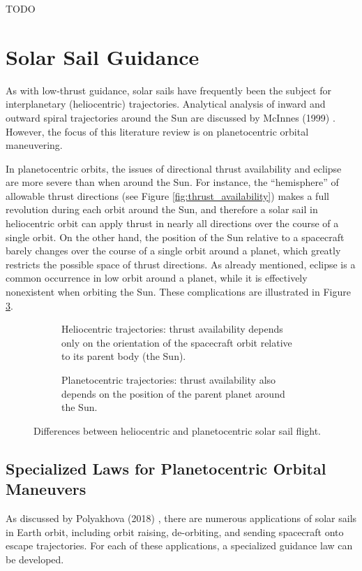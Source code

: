TODO


\section{Solar Sail Guidance}
As with low-thrust guidance, solar sails have frequently been the subject for interplanetary (heliocentric) trajectories. Analytical analysis of inward and outward spiral trajectories around the Sun are discussed by McInnes (1999) \cite{mcinnes}. However, the focus of this literature review is on planetocentric orbital maneuvering.

In planetocentric orbits, the issues of directional thrust availability and eclipse are more severe than when around the Sun. For instance, the ``hemisphere'' of allowable thrust directions (see Figure \ref{fig:thrust_availability}) makes a full revolution during each orbit around the Sun, and therefore a solar sail in heliocentric orbit can apply thrust in nearly all directions over the course of a single orbit. On the other hand, the position of the Sun relative to a spacecraft barely changes over the course of a single orbit around a planet, which greatly restricts the possible space of thrust directions. As already mentioned, eclipse is a common occurrence in low orbit around a planet, while it is effectively nonexistent when orbiting the Sun. These complications are illustrated in Figure \ref{fig:angle_availability}.

\begin{figure}[H]
    \centering
    \begin{subfigure}[t]{0.45\textwidth}
        
        \caption{Heliocentric trajectories: thrust availability depends only on the orientation of the spacecraft orbit relative to its parent body (the Sun).}
        \label{fig:angle_availability_sun}
    \end{subfigure}
    \hfill
    \begin{subfigure}[t]{0.45\textwidth}
        
        \caption{Planetocentric trajectories: thrust availability also depends on the position of the parent planet around the Sun.}
        \label{fig:angle_availability_earth}
    \end{subfigure}
    \caption{Differences between heliocentric and planetocentric solar sail flight.}
    \label{fig:angle_availability}
\end{figure}

\subsection{Specialized Laws for Planetocentric Orbital Maneuvers}
As discussed by Polyakhova (2018) \cite{polyakhova2018solar}, there are numerous applications of solar sails in Earth orbit, including orbit raising, de-orbiting, and sending spacecraft onto escape trajectories. For each of these applications, a specialized guidance law can be developed.

